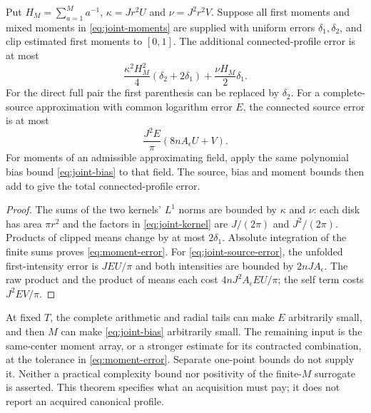 \begin{theorem}\label{thm:joint-interface}
Put $H_M=\sum_{a=1}^M a^{-1}$, $\kappa=Jr^2U$ and $\nu=J^2r^2V$.
Suppose all first moments and mixed moments in
\eqref{eq:joint-moments} are supplied with uniform errors
$\delta_1,\delta_2$, and clip estimated first moments to $[0,1]$.
The additional connected-profile error is at most
\begin{equation}\label{eq:moment-error}
 \frac{\kappa^2H_M^2}{4}(\delta_2+2\delta_1)
                 +\frac{\nu H_M}{2}\delta_1.
\end{equation}
For the direct full pair the first parenthesis can be replaced by
$\delta_2$. For a complete-source approximation with common logarithm
error $E$, the connected source error is at most
\begin{equation}\label{eq:joint-source-error}
 \frac{J^2E}{\pi}(8nA_\epsilon U+V).
\end{equation}
For moments of an admissible approximating field, apply the same
polynomial bias bound \eqref{eq:joint-bias} to that field. The source,
bias and moment bounds then add to give the total connected-profile error.
\end{theorem}
\begin{proof}
The sums of the two kernels' $L^1$ norms are bounded by $\kappa$ and
$\nu$: each disk has area $\pi r^2$ and the factors in
\eqref{eq:joint-kernel} are $J/(2\pi)$ and $J^2/(2\pi)$.
Products of clipped means change by at most $2\delta_1$.
Absolute integration of the finite sums proves \eqref{eq:moment-error}.
For \eqref{eq:joint-source-error}, the unfolded first-intensity error
is $JEU/\pi$ and both intensities are bounded by $2nJA_\epsilon$.
The raw product and the product of means each cost
$4nJ^2A_\epsilon EU/\pi$; the self term costs $J^2EV/\pi$.
\end{proof}

At fixed $T$, the complete arithmetic and radial tails can make $E$
arbitrarily small, and then $M$ can make \eqref{eq:joint-bias}
arbitrarily small. The remaining input is the same-center moment array,
or a stronger estimate for its contracted combination, at the tolerance
in \eqref{eq:moment-error}. Separate one-point bounds do not supply it.
Neither a practical complexity bound nor positivity of the finite-$M$
surrogate is asserted. This theorem specifies what an acquisition must
pay; it does not report an acquired canonical profile.
